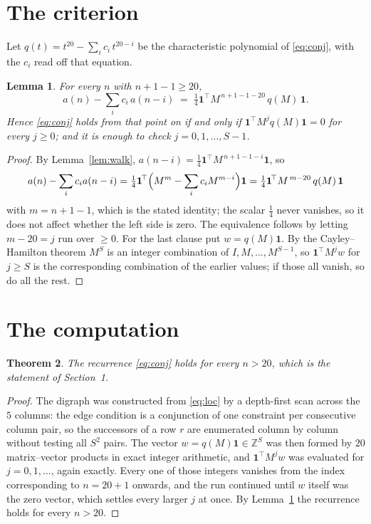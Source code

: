 \documentclass[11pt,a4paper]{article}
\theoremstyle{plain}
\newtheorem{theorem}{Theorem}
\newtheorem{lemma}[theorem]{Lemma}
\theoremstyle{definition}
\begin{document}
\section{The criterion}

Let $q(t)=t^{20}-\sum_i c_i\,t^{20-i}$ be the characteristic polynomial of
\eqref{eq:conj}, with the $c_i$ read off that equation.

\begin{lemma}\label{lem:crit}
For every $n$ with $n+1-1\ge20$,
\[
a(n)-\sum_i c_i\,a(n-i)\;=\;\tfrac1{4}\mathbf{1}^{\!\top}M^{\,n+1-1-20}\,q(M)\,\mathbf{1} .
\]
Hence \eqref{eq:conj} holds from that point on if and only if
$\mathbf{1}^{\!\top}M^{j}q(M)\mathbf{1}=0$ for every $j\ge0$; and it is enough to check
$j=0,1,\dots,S-1$.
\end{lemma}

\begin{proof}
By Lemma~\ref{lem:walk}, $a(n-i)=\tfrac1{4}\mathbf{1}^{\!\top}M^{\,n+1-1-i}\mathbf{1}$, so
\[
a(n)-\sum_i c_i a(n-i)
=\tfrac1{4}\mathbf{1}^{\!\top}\Bigl(M^{m}-\sum_i c_i M^{m-i}\Bigr)\mathbf{1}
=\tfrac1{4}\mathbf{1}^{\!\top}M^{\,m-20}\,q(M)\,\mathbf{1}
\]
with $m=n+1-1$, which is the stated identity; the scalar $\tfrac1{4}$ never vanishes, so
it does not affect whether the left side is zero. The equivalence follows by letting
$m-20=j$ run over $\ge0$. For the last clause put $w=q(M)\mathbf{1}$. By the
Cayley--Hamilton theorem $M^{S}$ is an integer combination of $I,M,\dots,M^{S-1}$, so
$\mathbf{1}^{\!\top}M^{j}w$ for $j\ge S$ is the corresponding combination of the earlier
values; if those all vanish, so do all the rest.
\end{proof}

\section{The computation}

\begin{theorem}
The recurrence \eqref{eq:conj} holds for every $n>20$, which is the statement of
Section~1.
\end{theorem}

\begin{proof}
The digraph was constructed from \eqref{eq:loc} by a depth-first scan across the $5$
columns: the edge condition is a conjunction of one constraint per consecutive column
pair, so the successors of a row $r$ are enumerated column by column without testing all
$S^2$ pairs. The vector $w=q(M)\mathbf{1}\in\mathbb{Z}^{S}$ was then formed by $20$
matrix--vector products in exact integer arithmetic, and $\mathbf{1}^{\!\top}M^{j}w$ was
evaluated for $j=0,1,\dots$, again exactly. Every one of those integers vanishes from the
index corresponding to $n=20+1$ onwards, and the run continued until $w$ itself was the
zero vector, which settles every larger $j$ at once. By Lemma~\ref{lem:crit} the recurrence
holds for every $n>20$.
\end{proof}
\end{document}
